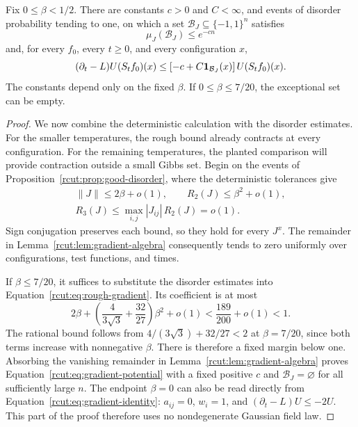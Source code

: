 \begin{proposition}
\label{rcut:prop:typical-gradient}
Fix $0\le\beta<1/2$.  There are constants $c>0$ and $C<\infty$,
and events of disorder probability tending to one, on which a set
$\mathcal B_J\subseteq\{-1,1\}^n$ satisfies
\[
 \mu_J(\mathcal B_J)\le e^{-cn}
\]
and, for every $f_0$, every $t\ge0$, and every configuration $x$,
\begin{equation}
 (\partial_t-L)U(S_tf_0)(x)
 \le[-c+C\mathbf 1_{\mathcal B_J}(x)]\,U(S_tf_0)(x).
\label{rcut:eq:gradient-potential}
\end{equation}
The constants depend only on the fixed $\beta$.  If
$0\le\beta\le7/20$, the exceptional set can be empty.
\end{proposition}

\begin{proof}
We now combine the deterministic calculation with the disorder estimates.
For the smaller temperatures, the rough bound already contracts at every
configuration.  For the remaining temperatures, the planted comparison
will provide contraction outside a small Gibbs set.  Begin on the
events of Proposition~\ref{rcut:prop:good-disorder}, where the deterministic
tolerances give
\[
 \begin{gathered}
 \|J\|\le2\beta+o(1),\qquad R_2(J)\le\beta^2+o(1),\\
 R_3(J)\le\max_{i,j}|J_{ij}|\,R_2(J)=o(1).
 \end{gathered}
\]
Sign conjugation preserves each bound, so they hold for every $J^x$.
The remainder in Lemma~\ref{rcut:lem:gradient-algebra} consequently tends
to zero uniformly over configurations, test functions, and times.

If $\beta\le7/20$, it suffices to substitute the disorder estimates
into Equation~\eqref{rcut:eq:rough-gradient}.  Its coefficient is at most
\[
 2\beta+
 \left(\frac{4}{3\sqrt3}+\frac{32}{27}\right)\beta^2+o(1)
 <\frac{189}{200}+o(1)<1.
\]
The rational bound follows from $4/(3\sqrt3)+32/27<2$ at
$\beta=7/20$, since both terms increase with nonnegative $\beta$.
There is therefore a fixed margin below one.  Absorbing the vanishing
remainder in Lemma~\ref{rcut:lem:gradient-algebra} proves
Equation~\eqref{rcut:eq:gradient-potential} with a fixed positive $c$
and $\mathcal B_J=\varnothing$ for all sufficiently large $n$.
The endpoint $\beta=0$ can also be read directly from
Equation~\eqref{rcut:eq:gradient-identity}: $a_{ij}=0$, $w_i=1$, and
$(\partial_t-L)U\le-2U$.  This part of the proof therefore uses no
nondegenerate Gaussian field law.


\end{proof}
